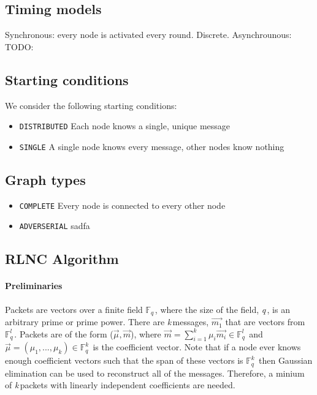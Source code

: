 \documentclass{article} %
\def\numMessages{\textit{k}\,}
\def\fieldSize{\textit{q}\,}
\begin{document}
\subsection{Timing models}
Synchronous: every node is activated every round. Discrete.
Asynchrounous: TODO:

\subsection{Starting conditions}\label{subsec:startingconditions}
We consider the following starting conditions:
\begin{itemize}
\item \texttt{DISTRIBUTED} Each node knows a single, unique message
\item \texttt{SINGLE} A single node knows every message, other nodes know nothing
\end{itemize}

\subsection{Graph types}
\begin{itemize}
\item \texttt{COMPLETE} Every node is connected to every other node
\item \texttt{ADVERSERIAL} sadfa
\end{itemize}

\subsection{RLNC Algorithm}
\paragraph{Preliminaries}
Packets are vectors over a finite field $\mathbb{F}_{\fieldSize}$, where the size of the field, \fieldSize, is an arbitrary prime or prime power. There are \numMessages messages, $\vec{m_{1}}$ that are vectors from $\mathbb{F}_{\fieldSize}^{l}$. Packets are of the form ($\vec{\mu}, \vec{m}$), where $\vec{m} = \sum_{i=1}^{\numMessages} \mu_i\vec{m_i} \in \mathbb{F}_{\fieldSize}^{l}$ and $\vec{\mu} = (\mu_1,...,\mu_k) \in \mathbb{F}_{\fieldSize}^{\numMessages}$ is the coefficient vector. Note that if a node ever knows enough coefficient vectors such that the span of these vectors is $\mathbb{F}_{\fieldSize}^{\numMessages}$ then Gaussian elimination can be used to reconstruct all of the messages. Therefore, a minium of \numMessages packets with linearly independent coefficients are needed.
\end{document}
